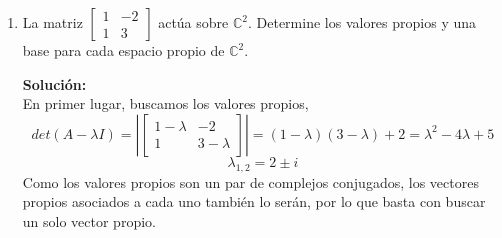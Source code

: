 \documentclass[12pt]{article}
\newenvironment{solucion}
{\begin{mdframed}[backgroundcolor=black!10]
		{\bf Solución:}\\
	}
	{
	\end{mdframed}
}
\newenvironment{preguntas}
{\begin{enumerate}\itemsep12pt
	}
	{
	\end{enumerate}
}
\begin{document}
\begin{preguntas}
\begin{solucion}
\begin{enumerate}[1)]
			\item $\lambda_3 = 3$\\
			\\
			Debemos resolver el sistema $(A-3I)v = 0$, esto es
			$$\begin{bmatrix}
			-2 & 2 & -1\\
			1 & -3 & 1\\
			4 & -4 & 2
			\end{bmatrix} \sim 
			\begin{bmatrix}
			1 & 0 & \frac{1}{4}\\
			0 & 1 & -\frac{1}{4}\\
			0 & 0 & 0
			\end{bmatrix}$$
			Por lo que
			$$\begin{array}{rcl}
			x_1 & = & -\dfrac{1}{4}x_3\\
			x_2 & = & \dfrac{1}{4}x_3\\
			x_3 & = & x_3
			\end{array} \Longrightarrow
			v_3 = \begin{pmatrix}
			-\frac{1}{4}\\
			\frac{1}{4}\\
			1
			\end{pmatrix} \rightarrow
			v_3 = \begin{pmatrix}
			-1\\
			1\\
			4
			\end{pmatrix}$$
		\end{enumerate}
		Finalmente, los vectores propios son
		$$v_1 = \begin{pmatrix}
		-1\\
		1\\
		2
		\end{pmatrix}, \quad
		v_2 = \begin{pmatrix}
		-2\\
		1\\
		4
		\end{pmatrix}, \quad
		v_3 = \begin{pmatrix}
		-1\\
		1\\
		4
		\end{pmatrix}$$
\end{solucion}
\item La matriz $\begin{bmatrix} 1 & -2 \\ 1 & 3 \end{bmatrix}$ actúa sobre $\mathbb{C}^2$. Determine los valores propios y una base para cada espacio propio de $\mathbb{C}^2$.
\begin{solucion}
En primer lugar, buscamos los valores propios,
		$$det(A-\lambda I) = \left|\begin{bmatrix} 
		1-\lambda & -2 \\ 
		1 & 3-\lambda \end{bmatrix}\right| = (1-\lambda)(3-\lambda) + 2 = \lambda^2 - 4\lambda + 5$$
		$$\lambda_{1,2} = 2 \pm i$$
		Como los valores propios son un par de complejos conjugados, los vectores propios asociados a cada uno también lo serán, por lo que basta con buscar un solo vector propio.
		

\end{solucion}
\end{preguntas}
\end{document}
